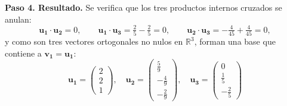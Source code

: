 \begin{example}
\begin{myproof}
\textbf{Paso 4. Resultado.} Se verifica que los tres productos internos cruzados se anulan:
\[
\mathbf{u_1}\cdot\mathbf{u_2} = 0, \qquad \mathbf{u_1}\cdot\mathbf{u_3} = \tfrac{2}{5} - \tfrac{2}{5} = 0, \qquad \mathbf{u_2}\cdot\mathbf{u_3} = -\tfrac{4}{45} + \tfrac{4}{45} = 0,
\]
y como son tres vectores ortogonales no nulos en $\mathbb{R}^3$, forman una base que contiene a $\mathbf{v_1} = \mathbf{u_1}$:
\[
\boxed{\mathbf{u_1} = \begin{pmatrix} 2 \\ 2 \\ 1 \end{pmatrix}, \quad \mathbf{u_2} = \begin{pmatrix} \frac{5}{9} \\ -\frac{4}{9} \\ -\frac{2}{9} \end{pmatrix}, \quad \mathbf{u_3} = \begin{pmatrix} 0 \\ \frac{1}{5} \\ -\frac{2}{5} \end{pmatrix}}
\]
\end{myproof}
\end{example}


